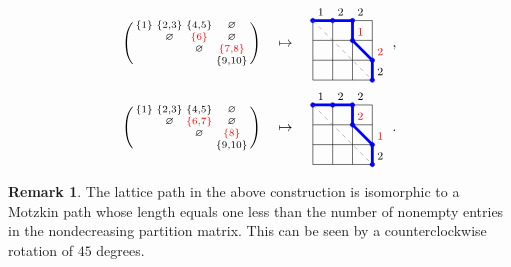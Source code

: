 \documentclass[12pt,reqno]{amsart}
\numberwithin{equation}{section}
\theoremstyle{theorem}
\theoremstyle{definition}
\newtheorem{remark}[theorem]{Remark}
\theoremstyle{named}
\begin{document}
\begin{align}
	\begin{psmallmatrix}
		\{1\} & \{2,3\} & \{4,5\} & \varnothing\\
		& \varnothing & {\color{red}\{6\}} & \varnothing\\
		& & \varnothing & {\color{red}\{7,8\}}\\
		& & & \{9,10\}
	\end{psmallmatrix} &\quad\mapsto\quad
	\vcenter{\hbox{\begin{tikzpicture}[scale=0.5]
				\draw (1,1) grid (4,4);
				\foreach\i\j in {1/4, 2/4, 3/4, 3/3, 4/2, 4/1}
				{\filldraw[blue] (\i,\j) circle(0.75ex);}
				\draw[line width=2pt,draw=blue] (1,4) -- (2,4) -- (3,4) -- (3,3) -- (4,2) -- (4,1);
				\draw[draw=gray,dashed] (1,4)--(4,1);
				\node[above right] at (1,4) {\footnotesize $1$};
				\node[above right] at (2,4) {\footnotesize $2$};
				\node[above right] at (3,4) {\footnotesize $2$};
				\node[above right] at (3,3) {\footnotesize ${\color{red}1}$};
				\node[above right] at (4,2) {\footnotesize ${\color{red}2}$};
				\node[above right] at (4,1) {\footnotesize $2$};
	\end{tikzpicture}}}\,\,,\label{eq:ndpm-ex1}\\
	\begin{psmallmatrix}
		\{1\} & \{2,3\} & \{4,5\} & \varnothing\\
		& \varnothing & {\color{red}\{6,7\}} & \varnothing\\
		& & \varnothing & {\color{red}\{8\}}\\
		& & & \{9,10\}
	\end{psmallmatrix} &\quad\mapsto\quad
	\vcenter{\hbox{\begin{tikzpicture}[scale=0.5]
				\draw (1,1) grid (4,4);
				\foreach\i\j in {1/4, 2/4, 3/4, 3/3, 4/2, 4/1}
				{\filldraw[blue] (\i,\j) circle(0.75ex);}
				\draw[line width=2pt,draw=blue] (1,4) -- (2,4) -- (3,4) -- (3,3) -- (4,2) -- (4,1);
				\draw[draw=gray,dashed] (1,4)--(4,1);
				\node[above right] at (1,4) {\footnotesize $1$};
				\node[above right] at (2,4) {\footnotesize $2$};
				\node[above right] at (3,4) {\footnotesize $2$};
				\node[above right] at (3,3) {\footnotesize ${\color{red}2}$};
				\node[above right] at (4,2) {\footnotesize ${\color{red}1}$};
				\node[above right] at (4,1) {\footnotesize $2$};
	\end{tikzpicture}}}\,\,.\label{eq:ndpm-ex2}
\end{align}

\begin{remark}
	The lattice path in the above construction is isomorphic to a Motzkin path whose length equals one less than the number of nonempty entries in the nondecreasing partition matrix. This can be seen by a counterclockwise rotation of $45$ degrees.
\end{remark}
\end{document}

